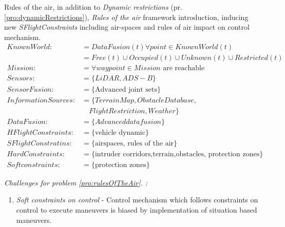 \begin{problem}{Rules of the air}\label{pro:rulesOfTheAir}, 
    in addition to \emph{Dynamic restrictions} (pr. \ref{pro:dynamicRestrictions}), \emph{Rules of the air} framework introduction, inducing new \emph{SFlightConstraints} including air-spaces and rules of air impact on control mechanism.
    \begin{equation}\label{eq:rulesOfTheAir}
        \begin{aligned}
            KnownWorld:&= DataFusion(t)\forall point\in KnownWorld(t)\\
                       &=Free(t) \cup Occupied(t) \cup Unknown(t) \cup Restricted(t)\\
            Mission:&= \forall waypoint\in Mission \text{ are reachable}\\
            Sensors:&= \{LiDAR,ADS-B\}\\
            SensorFusion:&= \{\text{Advanced joint sets}\}\\
            InformationSources:&=\{Terrain Map,Obstacle Database,\\
                               &\quad Flight Restriction,Weather\}\\
            DataFusion:&= \{Advanced data fusion\}\\
            HFlightConstraints:&=\{\text{vehicle dynamic}\}\\
            SFlightConstratins:&=\{\text{airspaces, rules of the air}\}\\
            HardConstraints:&=\{\text{intruder corridors,terrain,obstacles, protection zones}\}\\
            Softconstraints:&=\{\text{protection zones}\}
        \end{aligned}
    \end{equation}
    
    \ifproblemchallenge
    \noindent \emph{Challenges for problem  \ref{pro:rulesOfTheAir}. :}
    \begin{enumerate}
        \item \emph{Soft constraints on control} - Control mechanism which follows constraints on control to execute maneuvers is biased by implementation of situation based maneuvers. 
    \end{enumerate}
    \fi
\end{problem}